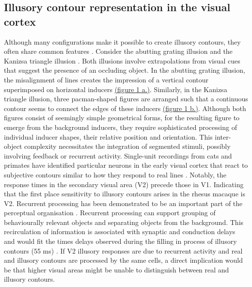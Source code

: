 \documentclass[12pt]{article}
\begin{document}
\subsection{Illusory contour representation in the visual cortex}
Although many configurations make it possible to create illusory contours, they often share common features \autocite{palmerLateInfluencesPerceptual2000}. Consider the abutting grating illusion \autocite{sorianoAbuttingGratingIllusion1996} and the Kanizsa triangle illusion \autocite{kanizsaSubjectiveContours1976}. Both illusions involve extrapolations from visual cues that suggest the presence of an occluding object. In the abutting grating illusion, the misalignment of lines creates the impression of a vertical contour superimposed on horizontal inducers \hyperref[fig:figure_1]{(figure 1 a.)}. Similarly, in the Kanizsa triangle illusion, three pacman-shaped figures are arranged such that a continuous contour seems to connect the edges of these inducers \hyperref[fig:figure_1]{(figure 1 b.)}. Although both figures consist of seemingly simple geometrical forms, for the resulting figure to emerge from the background inducers, they require sophisticated processing of individual inducer shapes, their relative position and orientation. This inter-object complexity necessitates the integration of segmented stimuli, possibly involving feedback or recurrent activity. Single-unit recordings from cats and primates have identified particular neurons in the early visual cortex that react to subjective contours similar to how they respond to real lines \autocite{leeDynamicsSubjectiveContour2001,vonderheydtMechanismsContourPerception1989}. Notably, the response times in the secondary visual area (V2) precede those in V1. Indicating that the first place sensitivity to illusory contours arises in the rhesus macaque is V2. Recurrent processing has been demonstrated to be an important part of the perceptual organisation \autocite{roelfsemaCORTICALALGORITHMSPERCEPTUAL2006}. Recurrent processing can support grouping of behaviourally relevant objects and separating objects from the background. This recirculation of information is associated with synaptic and conduction delays and would fit the times delays observed during the filling in process of illusory contours (55 ms) \autocite{leeDynamicsSubjectiveContour2001,pakTopDownFeedbackControls2020}. If V2 illusory responses are due to recurrent activity and real and illusory contours are processed by the same cells, a direct implication would be that higher visual areas might be unable to distinguish between real and illusory contours.
\end{document}
